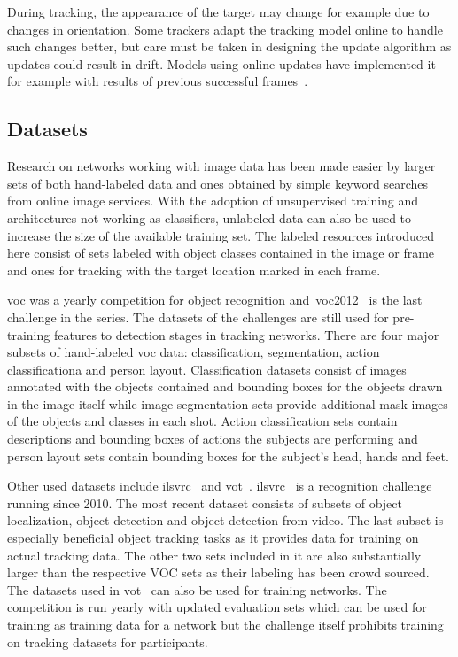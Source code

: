 During tracking, the appearance of the target may change for example due to changes in orientation. Some trackers adapt the tracking model online to handle such changes better, but care must be taken in designing the update algorithm as updates could result in drift. Models using online updates have implemented it for example with results of previous successful frames~\cite{BLUR_TRACK}.

\subsection{Datasets}
Research on networks working with image data has been made easier by larger sets of both hand-labeled data and ones obtained by simple keyword searches from online image services. With the adoption of unsupervised training and architectures not working as classifiers, unlabeled data can also be used to increase the size of the available training set. The labeled resources introduced here consist of sets labeled with object classes contained in the image or frame and ones for tracking with the target location marked in each frame.

\ac{voc} was a yearly competition for object recognition and~\ac{voc}2012~\cite{VOC12} is the last challenge in the series. The datasets of the challenges are still used for pre-training features to detection stages in tracking networks. There are four major subsets of hand-labeled \ac{voc} data: classification, segmentation, action classificationa and person layout. Classification datasets consist of images annotated with the objects contained and bounding boxes for the objects drawn in the image itself while image segmentation sets provide additional mask images of the objects and classes in each shot. Action classification sets contain descriptions and bounding boxes of actions the subjects are performing and person layout sets contain bounding boxes for the subject's head, hands and feet.

Other used datasets include \ac{ilsvrc}~\cite{ILSVRC15} and \ac{vot}~\cite{VOT}. \ac{ilsvrc}~\cite{ILSVRC15} is a recognition challenge running since 2010. The most recent dataset consists of subsets of object localization, object detection and object detection from video. The last subset is especially beneficial object tracking tasks as it provides data for training on actual tracking data. The other two sets included in it are also substantially larger than the respective VOC sets as their labeling has been crowd sourced. The datasets used in \ac{vot}~\cite{VOT} can also be used for training networks. The competition is run yearly with updated evaluation sets which can be used for training as training data for a network but the challenge itself prohibits training on tracking datasets for participants.

